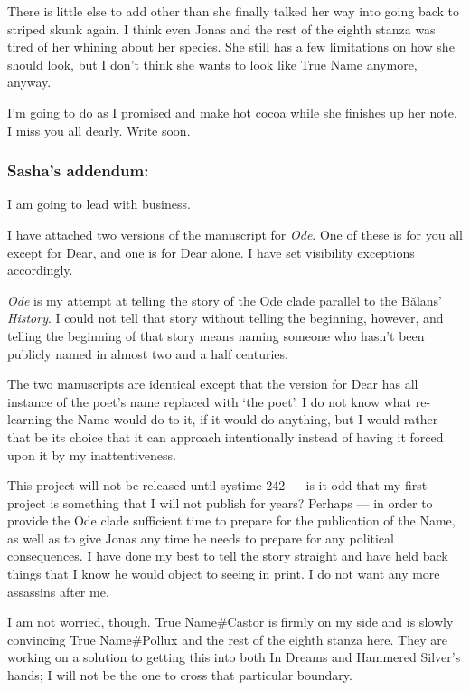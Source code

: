 There is little else to add other than she finally talked her way into going back to striped skunk again. I think even Jonas and the rest of the eighth stanza was tired of her whining about her species. She still has a few limitations on how she should look, but I don't think she wants to look like True Name anymore, anyway.

I'm going to do as I promised and make hot cocoa while she finishes up her note. I miss you all dearly. Write soon.

\hypertarget{sashas-addendum}{%
\subsubsection{Sasha's addendum:}\label{sashas-addendum}}

I am going to lead with business.

I have attached two versions of the manuscript for \emph{Ode}. One of these is for you all except for Dear, and one is for Dear alone. I have set visibility exceptions accordingly.

\emph{Ode} is my attempt at telling the story of the Ode clade parallel to the Bălans' \emph{History}. I could not tell that story without telling the beginning, however, and telling the beginning of that story means naming someone who hasn't been publicly named in almost two and a half centuries.

The two manuscripts are identical except that the version for Dear has all instance of the poet's name replaced with `the poet'. I do not know what re-learning the Name would do to it, if it would do anything, but I would rather that be its choice that it can approach intentionally instead of having it forced upon it by my inattentiveness.

This project will not be released until systime 242 — is it odd that my first project is something that I will not publish for years? Perhaps — in order to provide the Ode clade sufficient time to prepare for the publication of the Name, as well as to give Jonas any time he needs to prepare for any political consequences. I have done my best to tell the story straight and have held back things that I know he would object to seeing in print. I do not want any more assassins after me.

I am not worried, though. True Name\#Castor is firmly on my side and is slowly convincing True Name\#Pollux and the rest of the eighth stanza here. They are working on a solution to getting this into both In Dreams and Hammered Silver's hands; I will not be the one to cross that particular boundary.

